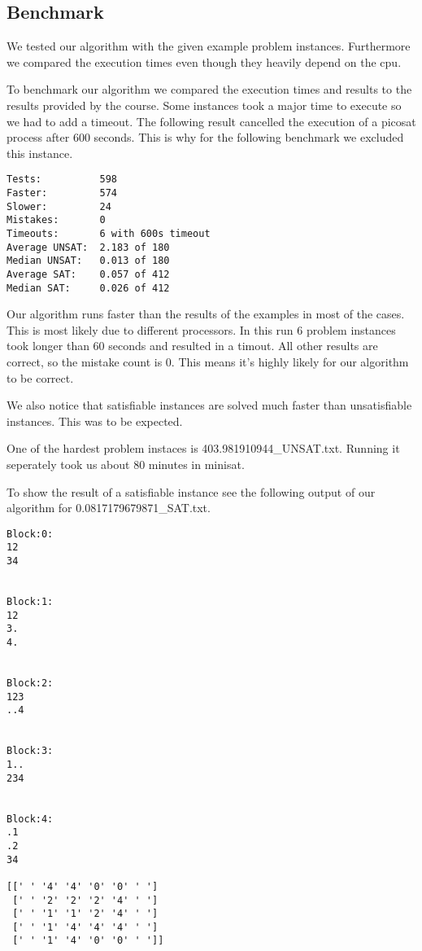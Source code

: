 \documentclass{base}
\begin{document}
\subsection*{Benchmark}

We tested our algorithm with the given example problem instances.
Furthermore we compared the execution times even though they heavily depend on the cpu.

To benchmark our algorithm we compared the execution times and results to the results provided by the course.
Some instances took a major time to execute so we had to add a timeout. The following result cancelled the execution of a picosat process after 600 seconds.
This is why for the following benchmark we excluded this instance.

\begin{lstlisting}
Tests:          598
Faster:         574
Slower:         24
Mistakes:       0
Timeouts:       6 with 600s timeout
Average UNSAT:  2.183 of 180
Median UNSAT:   0.013 of 180
Average SAT:    0.057 of 412
Median SAT:     0.026 of 412
\end{lstlisting}

Our algorithm runs faster than the results of the examples in most of the cases. This is most likely due to different processors.
In this run 6 problem instances took longer than 60 seconds and resulted in a timout.
All other results are correct, so the mistake count is 0. This means it's highly likely for our algorithm to be correct.

We also notice that satisfiable instances are solved much faster than unsatisfiable instances. This was to be expected.


One of the hardest problem instaces is 403.981910944\_UNSAT.txt. Running it seperately took us about 80 minutes in minisat.


To show the result of a satisfiable instance see the following output of our algorithm for 0.0817179679871\_SAT.txt.


\begin{lstlisting}
Block:0:
12
34


Block:1:
12
3.
4.


Block:2:
123
..4


Block:3:
1..
234


Block:4:
.1
.2
34

[[' ' '4' '4' '0' '0' ' ']
 [' ' '2' '2' '2' '4' ' ']
 [' ' '1' '1' '2' '4' ' ']
 [' ' '1' '4' '4' '4' ' ']
 [' ' '1' '4' '0' '0' ' ']]
\end{lstlisting}
\end{document}
